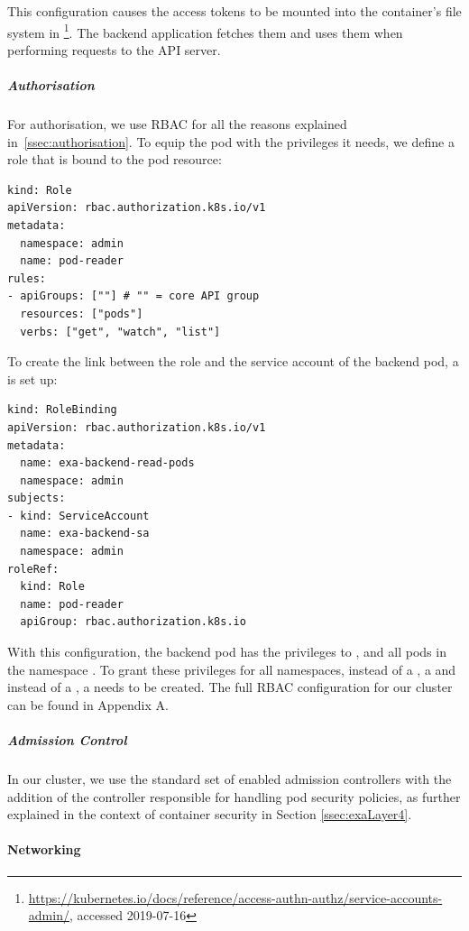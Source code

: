 This configuration causes the access tokens to be mounted into the container's file system in \footnote{\url{https://kubernetes.io/docs/reference/access-authn-authz/service-accounts-admin/}, accessed 2019-07-16}. The backend application fetches them and uses them when performing requests to the API server.

\subparagraph{Authorisation}
For authorisation, we use \ac{RBAC} for all the reasons explained in~\ref{ssec:authorisation}. To equip the pod with the privileges it needs, we define a role that is bound to the pod resource:

\begin{verbatim}
kind: Role
apiVersion: rbac.authorization.k8s.io/v1
metadata:
  namespace: admin
  name: pod-reader
rules:
- apiGroups: [""] # "" = core API group
  resources: ["pods"]
  verbs: ["get", "watch", "list"]
\end{verbatim}

To create the link between the role and the service account of the backend pod, a  is set up: 

\begin{verbatim}
kind: RoleBinding
apiVersion: rbac.authorization.k8s.io/v1
metadata:
  name: exa-backend-read-pods
  namespace: admin
subjects:
- kind: ServiceAccount
  name: exa-backend-sa 
  namespace: admin
roleRef:
  kind: Role
  name: pod-reader
  apiGroup: rbac.authorization.k8s.io
\end{verbatim}

With this configuration, the backend pod has the privileges to ,  and  all pods in the namespace . To grant these privileges for all namespaces, instead of a , a  and instead of a , a  needs to be created. The full \ac{RBAC} configuration for our cluster can be found in Appendix A.

\subparagraph{Admission Control}

In our cluster, we use the standard set of enabled admission controllers with the addition of the controller responsible for handling pod security policies, as further explained in the context of container security in Section \ref{ssec:exaLayer4}.


\paragraph{Networking}

